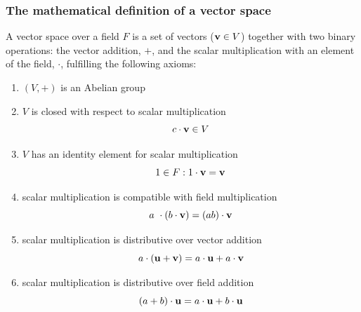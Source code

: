         \subsubsection{The mathematical definition of a vector space}
            A vector space over a field $F$ is a set of vectors ($\vb{v} \in V$) together with two binary operations: the vector addition, $+$, and the scalar multiplication with an element of the field, $\cdot$, fulfilling the following axioms:
                \begin{enumerate}
                    \item $(V,+)$ is an Abelian group

                    \item $V$ is closed with respect to scalar multiplication
                    \begin{equation}
                        c \cdot \vb{v} \in V
                    \end{equation}

                    \item $V$ has an identity element for scalar multiplication
                    \begin{equation}
                        1 \in F: 1 \cdot \vb{v} = \vb{v}
                    \end{equation}

                    \item scalar multiplication is compatible with field multiplication
                    \begin{equation}
                        a \cdot (b \cdot \vb{v}) = (ab) \cdot \vb{v}
                    \end{equation}

                    \item scalar multiplication is distributive over vector addition
                    \begin{equation}
                        a \cdot (\vb{u} + \vb{v}) = a \cdot \vb{u} + a \cdot \vb{v}
                    \end{equation}

                    \item scalar multiplication is distributive over field addition
                    \begin{equation}
                        (a + b) \cdot \vb{u} = a \cdot \vb{u} + b \cdot \vb{u}
                    \end{equation}
                \end{enumerate}

